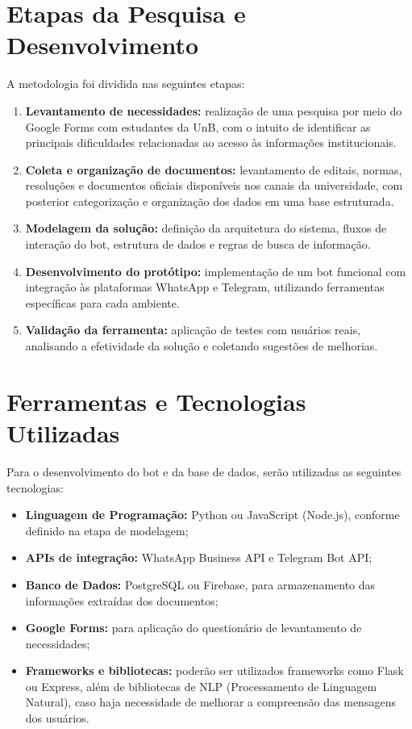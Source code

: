 \section{Etapas da Pesquisa e Desenvolvimento}

A metodologia foi dividida nas seguintes etapas:

\begin{enumerate}
    \item \textbf{Levantamento de necessidades:} realização de uma pesquisa por meio do Google Forms com estudantes da UnB, com o intuito de identificar as principais dificuldades relacionadas ao acesso às informações institucionais.
    
    \item \textbf{Coleta e organização de documentos:} levantamento de editais, normas, resoluções e documentos oficiais disponíveis nos canais da universidade, com posterior categorização e organização dos dados em uma base estruturada.
    
    \item \textbf{Modelagem da solução:} definição da arquitetura do sistema, fluxos de interação do bot, estrutura de dados e regras de busca de informação.
    
    \item \textbf{Desenvolvimento do protótipo:} implementação de um bot funcional com integração às plataformas WhatsApp e Telegram, utilizando ferramentas específicas para cada ambiente.
    
    \item \textbf{Validação da ferramenta:} aplicação de testes com usuários reais, analisando a efetividade da solução e coletando sugestões de melhorias.
\end{enumerate}

\section{Ferramentas e Tecnologias Utilizadas}

Para o desenvolvimento do bot e da base de dados, serão utilizadas as seguintes tecnologias:

\begin{itemize}
    \item \textbf{Linguagem de Programação:} Python ou JavaScript (Node.js), conforme definido na etapa de modelagem;
    \item \textbf{APIs de integração:} WhatsApp Business API e Telegram Bot API;
    \item \textbf{Banco de Dados:} PostgreSQL ou Firebase, para armazenamento das informações extraídas dos documentos;
    \item \textbf{Google Forms:} para aplicação do questionário de levantamento de necessidades;
    \item \textbf{Frameworks e bibliotecas:} poderão ser utilizados frameworks como Flask ou Express, além de bibliotecas de NLP (Processamento de Linguagem Natural), caso haja necessidade de melhorar a compreensão das mensagens dos usuários.
\end{itemize}

